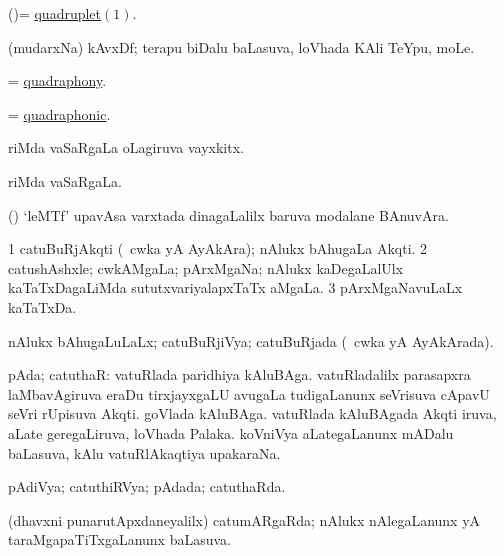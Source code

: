 \bentry
{}
\gl{\nA}
\bmng
(\AmA)= \hyperlink{quadruplet}{quadruplet\((1)\)}. 
\emng
\eentry

\bentry
{}
\gl{\nA}
\bmng
(mudarxNa) kAvxDf; terapu biDalu baLasuva, loVhada KAli TeYpu, moLe. 
\emng
\eentry

\bentry
{}
\gl{\nA}
\bmng
= \hyperlink{quadraphony}{quadraphony}. 
\emng
\eentry

\bentry
{}
\gl{\gu}
\bmng
= \hyperlink{quadraphonic}{quadraphonic}. 
\emng
\eentry

\bentry
{}
\gl{\nA}
\bmng
{} riMda  vaSaRgaLa oLagiruva vayxkitx. 
\emng
\eentry

\bentry
{}
\gl{\gu}
\bmng
{} riMda  vaSaRgaLa. 
\emng
\eentry

\bentry
{}
\gl{\nA}
\bmng
(\kerxY) `leMTf' upavAsa varxtada  dinagaLalilx baruva modalane BAnuvAra. 
\emng
\eentry

\bentry
{}
\gl{\nA}
\bmng
\bnum
\num{1} catuBuRjAkqti (\kanmu\ cwka yA AyAkAra); nAlukx bAhugaLa Akqti. 
\num{2} catushAshxle; cwkAMgaLa; pArxMgaNa; nAlukx kaDegaLalUlx kaTaTxDagaLiMda sututxvariyalapxTaTx aMgaLa. 
\num{3} pArxMgaNavuLaLx kaTaTxDa. 
\enum
\emng
\eentry

\bentry
{}
\gl{\gu}
\bmng
nAlukx bAhugaLuLaLx; catuBuRjiVya; catuBuRjada (\kanmu\ cwka yA AyAkArada). 
\emng
\eentry

\bentry
{}
\gl{\nA}
\bmng
pAda; catuthaR: 
\banum
{} vatuRlada paridhiya kAluBAga.  
 vatuRladalilx parasapxra laMbavAgiruva eraDu tirxjayxgaLU avugaLa tudigaLanunx seVrisuva cApavU seVri rUpisuva Akqti. 
 goVlada kAluBAga. 
 vatuRlada kAluBAgada Akqti iruva, aLate geregaLiruva, loVhada Palaka. 
 koVniVya aLategaLanunx mADalu baLasuva, kAlu vatuRlAkaqtiya upakaraNa. 
\eanum
\emng
\eentry

\bentry
{}
\gl{\gu}
\bmng
pAdiVya; catuthiRVya; pAdada; catuthaRda. 
\emng
\eentry

\bentry
{}
\gl{\gu}
\bmng
(dhavxni punarutApxdaneyalilx) catumARgaRda; nAlukx nAlegaLanunx yA taraMgapaTiTxgaLanunx baLasuva. 
\emng
\eentry

